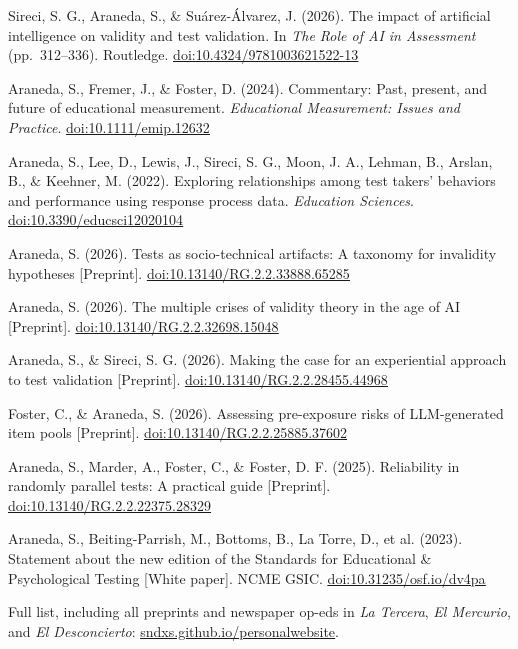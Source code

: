 \documentclass[10pt]{article}
\newcommand{\link}[2]{\href{#1}{\color{cvaccent}\uline{#2}}}
\newcommand{\rsec}[1]{%
  \par\vspace{8pt}{\bfseries\fontsize{8.5}{10}\selectfont\color{cvaccent}\MakeUppercase{#1}}\par\vspace{3pt}%
  \nointerlineskip{\color{cvhairline}\rule{\linewidth}{0.8pt}}\par\vspace{3pt}}
\newcommand{\rpub}[1]{\par\noindent\hangindent=11pt\hangafter=1\raggedright #1\par\vspace{2.5pt}}
\begin{document}
\newpage
\rsec{Selected Publications}
\rpub{Sireci, S. G., Araneda, S., \& Su\'arez-\'Alvarez, J. (2026). The impact of artificial intelligence on validity and test validation. In \textit{The Role of AI in Assessment} (pp.\ 312--336). Routledge. \link{https://doi.org/10.4324/9781003621522-13}{doi:10.4324/9781003621522-13}}
\rpub{Araneda, S., Fremer, J., \& Foster, D. (2024). Commentary: Past, present, and future of educational measurement. \textit{Educational Measurement: Issues and Practice}. \link{https://doi.org/10.1111/emip.12632}{doi:10.1111/emip.12632}}
\rpub{Araneda, S., Lee, D., Lewis, J., Sireci, S. G., Moon, J. A., Lehman, B., Arslan, B., \& Keehner, M. (2022). Exploring relationships among test takers' behaviors and performance using response process data. \textit{Education Sciences}. \link{https://doi.org/10.3390/educsci12020104}{doi:10.3390/educsci12020104}}
\rpub{Araneda, S. (2026). Tests as socio-technical artifacts: A taxonomy for invalidity hypotheses [Preprint]. \link{https://doi.org/10.13140/RG.2.2.33888.65285}{doi:10.13140/RG.2.2.33888.65285}}
\rpub{Araneda, S. (2026). The multiple crises of validity theory in the age of AI [Preprint]. \link{https://doi.org/10.13140/RG.2.2.32698.15048}{doi:10.13140/RG.2.2.32698.15048}}
\rpub{Araneda, S., \& Sireci, S. G. (2026). Making the case for an experiential approach to test validation [Preprint]. \link{https://doi.org/10.13140/RG.2.2.28455.44968}{doi:10.13140/RG.2.2.28455.44968}}
\rpub{Foster, C., \& Araneda, S. (2026). Assessing pre-exposure risks of LLM-generated item pools [Preprint]. \link{https://doi.org/10.13140/RG.2.2.25885.37602}{doi:10.13140/RG.2.2.25885.37602}}
\rpub{Araneda, S., Marder, A., Foster, C., \& Foster, D. F. (2025). Reliability in randomly parallel tests: A practical guide [Preprint]. \link{https://doi.org/10.13140/RG.2.2.22375.28329}{doi:10.13140/RG.2.2.22375.28329}}
\rpub{Araneda, S., Beiting-Parrish, M., Bottoms, B., La Torre, D., et al. (2023). Statement about the new edition of the Standards for Educational \& Psychological Testing [White paper]. NCME GSIC. \link{https://doi.org/10.31235/osf.io/dv4pa}{doi:10.31235/osf.io/dv4pa}}
{\fontsize{8.5}{10}\selectfont\color{cvmuted}Full list, including all preprints and newspaper op-eds in \textit{La Tercera}, \textit{El Mercurio}, and \textit{El Desconcierto}: \link{https://sndxs.github.io/personalwebsite/}{sndxs.github.io/personalwebsite}.}\par
\end{document}
